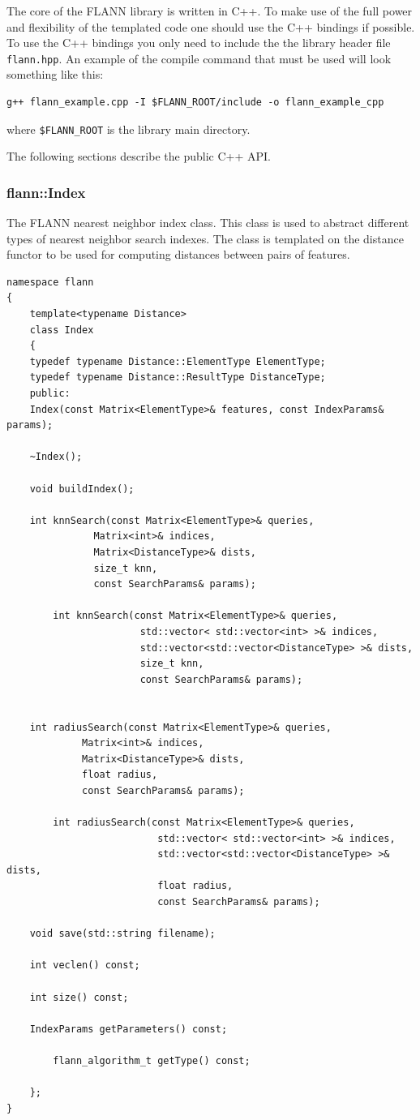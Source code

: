 \documentclass[letter,10pt]{article}
\begin{document}
The core of the FLANN library is written in C++. To make use of the full power 
and flexibility of the templated code one should use the C++ bindings if possible. 
To use the C++ bindings you only need to include the  the library header file \texttt{flann.hpp}. An example
of the compile command that must be used will look something like this:
\begin{Verbatim}[fontsize=\footnotesize]
g++ flann_example.cpp -I $FLANN_ROOT/include -o flann_example_cpp
\end{Verbatim}
where \texttt{\$FLANN\_ROOT} is the library main directory.

The following sections describe the public C++ API.

\subsubsection{flann::Index}
\label{sec:flann::Index}
The FLANN nearest neighbor index class. This class is used to abstract different types of nearest neighbor search
indexes. The class is templated on the distance functor to be used for computing distances between pairs of features. 

\begin{Verbatim}[fontsize=\footnotesize,frame=single]
namespace flann
{
    template<typename Distance>
    class Index 
    {
	typedef typename Distance::ElementType ElementType;
	typedef typename Distance::ResultType DistanceType;
    public:
	Index(const Matrix<ElementType>& features, const IndexParams& params);

	~Index();

	void buildIndex();

	int knnSearch(const Matrix<ElementType>& queries, 
		       Matrix<int>& indices, 
		       Matrix<DistanceType>& dists, 
		       size_t knn, 
		       const SearchParams& params);

        int knnSearch(const Matrix<ElementType>& queries,
                       std::vector< std::vector<int> >& indices,
                       std::vector<std::vector<DistanceType> >& dists,
                       size_t knn,
                       const SearchParams& params);


	int radiusSearch(const Matrix<ElementType>& queries, 
			 Matrix<int>& indices, 
			 Matrix<DistanceType>& dists, 
			 float radius, 
			 const SearchParams& params);

        int radiusSearch(const Matrix<ElementType>& queries,
                          std::vector< std::vector<int> >& indices,
                          std::vector<std::vector<DistanceType> >& dists,
                          float radius,
                          const SearchParams& params);

	void save(std::string filename);

	int veclen() const;

	int size() const;

	IndexParams getParameters() const;

        flann_algorithm_t getType() const;

    };
}
\end{Verbatim}
\end{document}
